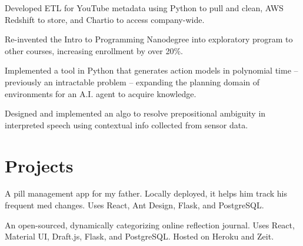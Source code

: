 \documentclass[]{deedy-resume-openfont}
\begin{document}
\begin{minipage}[t]{0.66\textwidth}
\begin{tightemize}
\end{tightemize}
\sectionsep

\begin{tightemize}

\item Developed ETL for YouTube metadata using Python to pull and clean, AWS Redshift to store, and Chartio to access company-wide.
\item Re-invented the Intro to Programming Nanodegree into exploratory program to other courses, increasing enrollment by over 20\%.

\end{tightemize}
\sectionsep

\begin{tightemize}
\item Implemented a tool in Python that generates action models in polynomial time -- previously an intractable problem -- expanding the planning domain of environments for an A.I. agent to acquire knowledge.
\item Designed and implemented an algo to resolve prepositional ambiguity in interpreted speech using contextual info collected from sensor data.
\end{tightemize}
\sectionsep

\section{Projects}

\begin{tightemize}
\item A pill management app for my father. Locally deployed, it helps him track his frequent med changes. Uses React, Ant Design, Flask, and PostgreSQL.
\end{tightemize}
\sectionsep

\begin{tightemize}
\item An open-sourced, dynamically categorizing online reflection journal. Uses React, Material UI, Draft.js, Flask, and PostgreSQL. Hosted on Heroku and Zeit.
\end{tightemize}
\sectionsep


\end{minipage}
\end{document}
